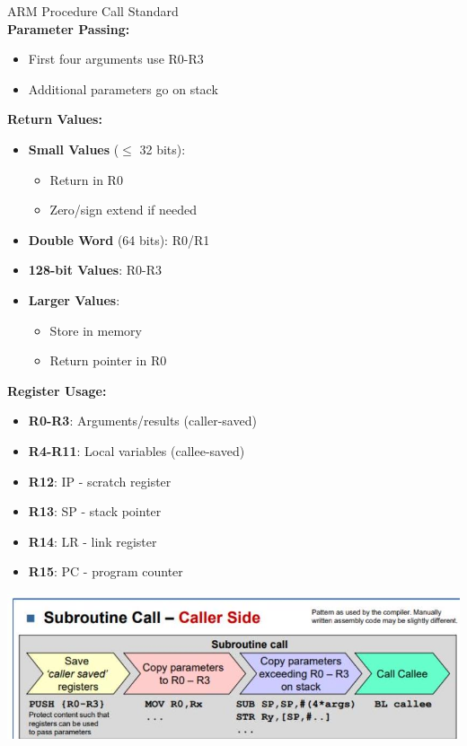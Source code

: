 \begin{definition}{ARM Procedure Call Standard}\\
\textbf{Parameter Passing:}
\begin{itemize}
  \item First four arguments use R0-R3
  \item Additional parameters go on stack
\end{itemize}

\textbf{Return Values:}
\begin{itemize}
  \item \textbf{Small Values} ($\leqslant$ 32 bits): 
    \begin{itemize}
      \item Return in R0
      \item Zero/sign extend if needed
    \end{itemize}
  \item \textbf{Double Word} (64 bits): R0/R1
  \item \textbf{128-bit Values}: R0-R3
  \item \textbf{Larger Values}: 
    \begin{itemize}
      \item Store in memory
      \item Return pointer in R0
    \end{itemize}
\end{itemize}

\textbf{Register Usage:}
\begin{itemize}
  \item \textbf{R0-R3}: Arguments/results (caller-saved)
  \item \textbf{R4-R11}: Local variables (callee-saved)
  \item \textbf{R12}: IP - scratch register
  \item \textbf{R13}: SP - stack pointer
  \item \textbf{R14}: LR - link register
  \item \textbf{R15}: PC - program counter
\end{itemize}

\includegraphics[width=\linewidth]{images/2024_12_29_79e6b22f503fb7b4f718g-09(3)}
\end{definition}

